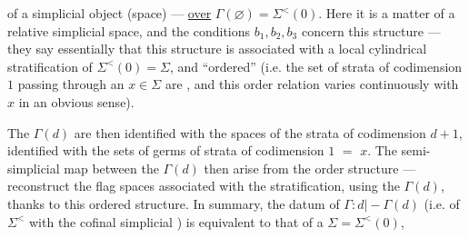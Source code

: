 of a simplicial object (space) --- \uline{over}
$\Gamma(\varnothing)=\Sigma^{<}(0)$. Here it is a matter of a relative
simplicial space, and the conditions $b_1,b_2,b_3$
concern this structure --- they say
essentially that this structure is associated
with a local cylindrical stratification of
$\Sigma^{<}(0)=\Sigma$, and ``ordered'' (i.e. the set of
strata of codimension $1$ passing through an $x\in\Sigma$ are
 , and this order relation varies
continuously with $x$ in an obvious sense).

The  $\Gamma(d)$ are then identified
with the  spaces of the  strata of codimension
$d+1$,   identified  with the sets of germs of strata
of codimension $1$   $=$ $x$. The semi-simplicial map
between the $\Gamma(d)$ then arise
from the order structure --- 
 reconstruct the flag spaces
associated with the stratification, using the
 $\Gamma(d)$, thanks to this ordered structure.
In summary, the datum of $\Gamma:d\mathrel{\mid\! -\!}\Gamma(d)$
 (i.e. of $\Sigma^{<}$ with the cofinal  simplicial )
is equivalent to that of a $\Sigma=\Sigma^{<}(0)$,
